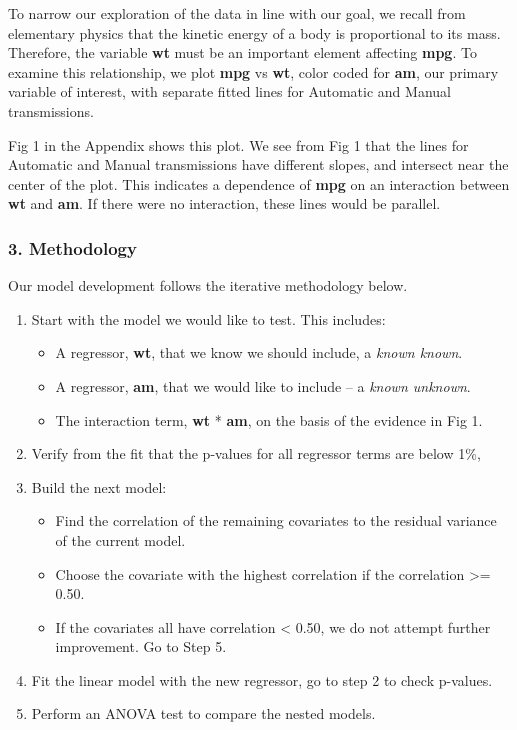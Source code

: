 \documentclass[10pt,]{article}
\begin{document}
To narrow our exploration of the data in line with our goal, we recall
from elementary physics that the kinetic energy of a body is
proportional to its mass. Therefore, the variable \textbf{wt} must be an
important element affecting \textbf{mpg}. To examine this relationship,
we plot \textbf{mpg} vs \textbf{wt}, color coded for \textbf{am}, our
primary variable of interest, with separate fitted lines for Automatic
and Manual transmissions.

Fig 1 in the Appendix shows this plot. We see from Fig 1 that the lines
for Automatic and Manual transmissions have different slopes, and
intersect near the center of the plot. This indicates a dependence of
\textbf{mpg} on an interaction between \textbf{wt} and \textbf{am}. If
there were no interaction, these lines would be parallel.

\subsubsection{3. Methodology}\label{methodology}

Our model development follows the iterative methodology below.

\begin{enumerate}
\def\labelenumi{\arabic{enumi}.}
\itemsep1pt\parskip0pt
\item
  Start with the model we would like to test. This includes:

  \begin{itemize}
  \itemsep1pt\parskip0pt
  \item
    A regressor, \textbf{wt}, that we know we should include, a
    \emph{known known}.
  \item
    A regressor, \textbf{am}, that we would like to include -- a
    \emph{known unknown}.
  \item
    The interaction term, \textbf{wt} * \textbf{am}, on the basis of the
    evidence in Fig 1.
  \end{itemize}
\item
  Verify from the fit that the p-values for all regressor terms are
  below 1\%,
\item
  Build the next model:

  \begin{itemize}
  \itemsep1pt\parskip0pt
  \item
    Find the correlation of the remaining covariates to the residual
    variance of the current model.
  \item
    Choose the covariate with the highest correlation if the
    \textbar{}correlation\textbar{} \textgreater{}= 0.50.
  \item
    If the covariates all have \textbar{}correlation\textbar{}
    \textless{} 0.50, we do not attempt further improvement. Go to Step
    5.
  \end{itemize}
\item
  Fit the linear model with the new regressor, go to step 2 to check
  p-values.
\item
  Perform an ANOVA test to compare the nested models.
\end{enumerate}
\end{document}
